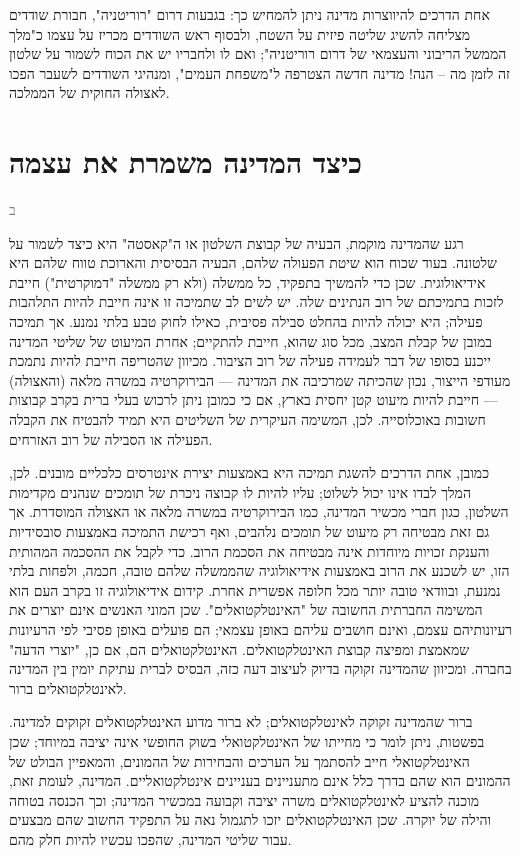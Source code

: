 \documentclass[10pt,oneside]{book}
\newcommand{\hebrewchapter}[2]{%
  \chapter*{#1}%
  \addcontentsline{toc}{chapter}{#1}%
  \lettrine[lines=4, lhang=0.1, loversize=0.5, findent=0pt]{\textcolor{gray} #2}{}%
}
\begin{document}
אחת הדרכים להיווצרות מדינה ניתן להמחיש כך: בגבעות דרום "רוריטניה", חבורת שודדים מצליחה להשיג שליטה פיזית על השטח, ולבסוף ראש השודדים מכריז על עצמו כ"מלך הממשל הריבוני והעצמאי של דרום רוריטניה"; ואם לו ולחבריו יש את הכוח לשמור על שלטון זה לזמן מה – הנה! מדינה חדשה הצטרפה ל"משפחת העמים", ומנהיגי השודדים לשעבר הפכו לאצולה החוקית של הממלכה.

\hebrewchapter{כיצד המדינה משמרת את עצמה}{ב}
רגע שהמדינה מוקמת, הבעיה של קבוצת השלטון או ה"קאסטה" היא כיצד לשמור על שלטונה. בעוד שכוח הוא שיטת הפעולה שלהם, הבעיה הבסיסית והארוכת טווח שלהם היא אידיאולוגית. שכן כדי להמשיך בתפקיד, כל ממשלה (ולא רק ממשלה "דמוקרטית") חייבת לזכות בתמיכתם של רוב הנתינים שלה. יש לשים לב שתמיכה זו אינה חייבת להיות התלהבות פעילה; היא יכולה להיות בהחלט סבילה פסיבית, כאילו לחוק טבע בלתי נמנע. אך תמיכה במובן של קבלת המצב, מכל סוג שהוא, חייבת להתקיים; אחרת המיעוט של שליטי המדינה ייכנע בסופו של דבר לעמידה פעילה של רוב הציבור. מכיוון שהטריפה חייבת להיות נתמכת מעודפי הייצור, נכון שהכיתה שמרכיבה את המדינה — הבירוקרטיה במשרה מלאה (והאצולה) — חייבת להיות מיעוט קטן יחסית בארץ, אם כי כמובן ניתן לרכוש בעלי ברית בקרב קבוצות חשובות באוכלוסייה. לכן, המשימה העיקרית של השליטים היא תמיד להבטיח את הקבלה הפעילה או הסבילה של רוב האזרחים.

כמובן, אחת הדרכים להשגת תמיכה היא באמצעות יצירת אינטרסים כלכליים מובנים. לכן, המלך לבדו אינו יכול לשלוט; עליו להיות לו קבוצה ניכרת של תומכים שנהנים מקדימות השלטון, כגון חברי מכשיר המדינה, כמו הבירוקרטיה במשרה מלאה או האצולה המוסדרת. אך גם זאת מבטיחה רק מיעוט של תומכים נלהבים, ואף רכישת התמיכה באמצעות סובסידיות והענקת זכויות מיוחדות אינה מבטיחה את הסכמת הרוב. כדי לקבל את ההסכמה המהותית הזו, יש לשכנע את הרוב באמצעות אידיאולוגיה שהממשלה שלהם טובה, חכמה, ולפחות בלתי נמנעת, ובוודאי טובה יותר מכל חלופה אפשרית אחרת. קידום אידיאולוגיה זו בקרב העם הוא המשימה החברתית החשובה של "האינטלקטואלים". שכן המוני האנשים אינם יוצרים את רעיונותיהם עצמם, ואינם חושבים עליהם באופן עצמאי; הם פועלים באופן פסיבי לפי הרעיונות שמאמצת ומפיצה קבוצת האינטלקטואלים. האינטלקטואלים הם, אם כן, "יוצרי הדעה" בחברה. ומכיוון שהמדינה זקוקה בדיוק לעיצוב דעה כזה, הבסיס לברית עתיקת יומין בין המדינה לאינטלקטואלים ברור.

ברור שהמדינה זקוקה לאינטלקטואלים; לא ברור מדוע האינטלקטואלים זקוקים למדינה. בפשטות, ניתן לומר כי מחייתו של האינטלקטואלי בשוק החופשי אינה יציבה במיוחד; שכן האינטלקטואלי חייב להסתמך על הערכים והבחירות של ההמונים, והמאפיין הבולט של ההמונים הוא שהם בדרך כלל אינם מתעניינים בעניינים אינטלקטואליים. המדינה, לעומת זאת, מוכנה להציע לאינטלקטואלים משרה יציבה וקבועה במכשיר המדינה; וכך הכנסה בטוחה והילה של יוקרה. שכן האינטלקטואלים יזכו לתגמול נאה על התפקיד החשוב שהם מבצעים עבור שליטי המדינה, שהפכו עכשיו להיות חלק מהם.
\end{document}

